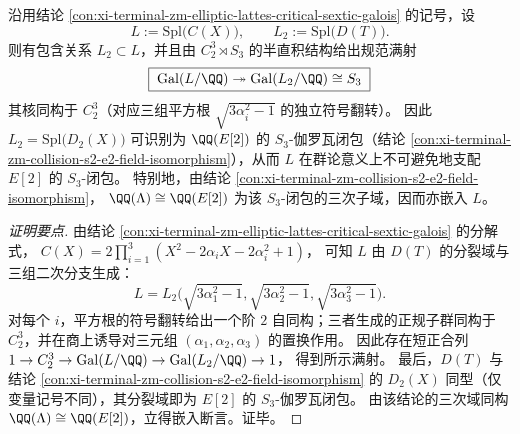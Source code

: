 \begin{conclusion}\label{con:xi-terminal-zm-elliptic-lattes-critical-sextic-s3-quotient}
沿用结论 \ref{con:xi-terminal-zm-elliptic-lattes-critical-sextic-galois} 的记号，设
\[
L:=\mathrm{Spl}\bigl(C(X)\bigr),\qquad L_{2}:=\mathrm{Spl}\bigl(D(T)\bigr).
\]
则有包含关系 \(L_2\subset L\)，并且由 \(C_2^3\rtimes S_3\) 的半直积结构给出规范满射
\[
\boxed{\;
\mathrm{Gal}(L/\QQ)\twoheadrightarrow \mathrm{Gal}(L_2/\QQ)\cong S_3\;}
\]
其核同构于 \(C_2^3\)（对应三组平方根 \(\sqrt{3\alpha_i^2-1}\) 的独立符号翻转）。
因此 \(L_2=\mathrm{Spl}\bigl(D_2(X)\bigr)\) 可识别为 \(\QQ(E[2])\) 的 \(S_3\)-伽罗瓦闭包（结论 \ref{con:xi-terminal-zm-collision-s2-e2-field-isomorphism}），从而 \(L\) 在群论意义上不可避免地支配 \(E[2]\) 的 \(S_3\)-闭包。
特别地，由结论 \ref{con:xi-terminal-zm-collision-s2-e2-field-isomorphism}，
\(
\QQ(\Lambda)\cong \QQ(E[2])
\)
为该 \(S_3\)-闭包的三次子域，因而亦嵌入 \(L\)。
\end{conclusion}
\begin{proof}[证明要点]
由结论 \ref{con:xi-terminal-zm-elliptic-lattes-critical-sextic-galois} 的分解式，
\(
C(X)=2\prod_{i=1}^{3}(X^{2}-2\alpha_{i}X-2\alpha_{i}^{2}+1)
\)，
可知 \(L\) 由 \(D(T)\) 的分裂域与三组二次分支生成：
\[
L=L_2\bigl(\sqrt{3\alpha_1^2-1},\sqrt{3\alpha_2^2-1},\sqrt{3\alpha_3^2-1}\bigr).
\]
对每个 \(i\)，平方根的符号翻转给出一个阶 \(2\) 自同构；三者生成的正规子群同构于 \(C_2^3\)，并在商上诱导对三元组 \((\alpha_1,\alpha_2,\alpha_3)\) 的置换作用。
因此存在短正合列
\(
1\to C_2^3\to \mathrm{Gal}(L/\QQ)\to \mathrm{Gal}(L_2/\QQ)\to 1
\)，
得到所示满射。
最后，\(D(T)\) 与结论 \ref{con:xi-terminal-zm-collision-s2-e2-field-isomorphism} 的 \(D_2(X)\) 同型（仅变量记号不同），其分裂域即为 \(E[2]\) 的 \(S_3\)-伽罗瓦闭包。
由该结论的三次域同构 \(\QQ(\Lambda)\cong\QQ(E[2])\)，立得嵌入断言。证毕。
\end{proof}

